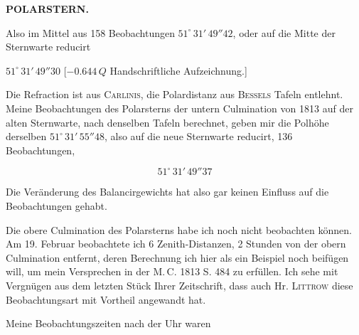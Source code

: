 \clearpage
\endgroup
\begingroup
\pagestyle{empty}
\newcommand{\GaussVIGathering}[2]{%
  \fancypagestyle{gaussVIGathering}{%
    \fancyhf{}%
    \renewcommand{\headrulewidth}{0pt}%
    \renewcommand{\footrulewidth}{0pt}%
    \fancyfoot[C]{\makebox[\textwidth][l]{%
      \hspace*{.025\textwidth}{\footnotesize\bfseries #1}\hfill
      {\normalsize\bfseries\textls[90]{#2}}\hspace*{.18\textwidth}}}%
  }%
  \thispagestyle{gaussVIGathering}%
}
\thispagestyle{empty}
\noindent{}%
\makebox[12mm][l]{}%
\parbox[t]{\dimexpr\linewidth-24mm\relax}{\centering\footnotesize\bfseries POLARSTERN.\par}%
\par\nobreak\medskip
\par\indent Also im Mittel aus 158 Beobachtungen $51^\circ\,31'\,49''42$, oder auf die Mitte der Sternwarte reducirt

\begin{center}\fontsize{10}{12}\selectfont $51^\circ\,31'\,49''30$ [$-0.644\,Q$ Handschriftliche Aufzeichnung.]\end{center}

\par\indent Die Refraction ist aus \textsc{Carlinis}, die Polardistanz aus \textsc{Bessels} Tafeln entlehnt. Meine Beobachtungen des Polarsterns der untern Culmination von 1813 auf der alten Sternwarte, nach denselben Tafeln berechnet, geben mir die Polhöhe derselben $51^\circ\,31'\,55''48$, also auf die neue Sternwarte reducirt, 136 Beobachtungen,

\[ 51^\circ\,31'\,49''37 \]

\par\indent Die Veränderung des Balancirgewichts hat also gar keinen Einfluss auf die Beobachtungen gehabt.

\par\indent Die obere Culmination des Polarsterns habe ich noch nicht beobachten können. Am 19. Februar beobachtete ich 6 Zenith-Distanzen, 2 Stunden von der obern Culmination entfernt, deren Berechnung ich hier als ein Beispiel noch beifügen will, um mein Versprechen in der M.\,C. 1813 S. 484 zu erfüllen. Ich sehe mit Vergnügen aus dem letzten Stück Ihrer Zeitschrift, dass auch Hr. \textsc{Littrow} diese Beobachtungsart mit Vortheil angewandt hat.

\par\indent Meine Beobachtungszeiten nach der Uhr waren

